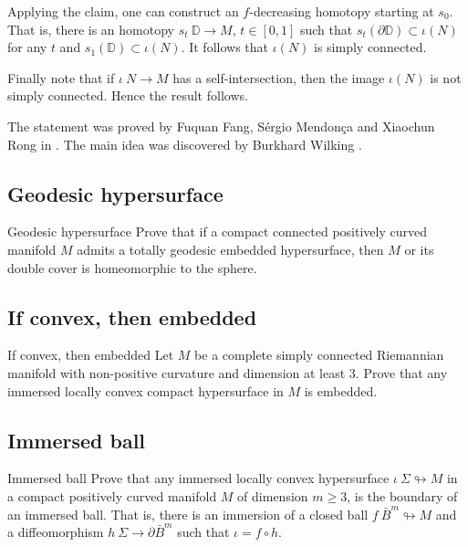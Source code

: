 Applying the claim, one can construct an $f$-decreasing homotopy starting at $s_0$.
That is,
there is an homotopy $s_t\:\mathbb D\to M$, $t\in [0,1]$ 
such that $s_t(\partial \mathbb D)\subset \iota(N)$ for any $t$ 
and $s_1(\mathbb D)\subset \iota(N)$.
It follows that $\iota(N)$ is simply connected.

Finally note that if $\iota\:N\to M$ has a self-intersection,
then the image
$\iota(N)$ is not simply connected.
Hence the result follows.\qeds


The statement was proved by 
Fuquan Fang, 
S\'ergio Mendon\c{c}a 
and Xiaochun Rong in \cite{FMR}.
The main idea was discovered by 
Burkhard Wilking \cite[see][]{wilking-2003}.

\subsection*{Geodesic hypersurface}
\begin{pr}{\easy}{Geodesic hypersurface}\label{Geodesic hypersurface}
Prove that 
if a compact connected positively curved manifold $M$ admits a totally geodesic embedded hypersurface,
then $M$ or its double cover is homeomorphic to the sphere.
\end{pr}

\subsection*{If convex, then embedded}

\begin{pr}{}{If convex, then embedded}\label{If convex then embedded} 
Let $M$ be a complete simply connected Riemannian manifold 
with non-positive curvature 
and dimension at least $3$.
Prove that any immersed locally convex
compact hypersurface in $M$ is embedded.
\end{pr}

\subsection*{Immersed ball\hard}

\begin{pr}{\hard}{Immersed ball}\label{Immersed ball}
Prove that any immersed locally convex
hypersurface $\iota\:\Sigma\looparrowright M$
in a compact positively curved manifold $M$ of dimension $m\ge 3$, is the boundary of an immersed ball. 
That is, there is an immersion of a closed ball $f\:\bar B^m\looparrowright M$ and a diffeomorphism $h\:\Sigma\to\partial \bar B^m$
such that $\iota=f\circ h$.
\end{pr}

